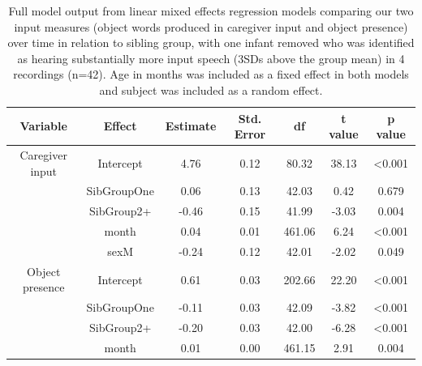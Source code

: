 \documentclass[
  man,floatsintext]{apa6}
\begin{document}
\begin{longtable}[t]{ccccccc}
\caption{\label{tab:table-input-model-summary-red}Full model output from linear mixed effects regression models comparing our two input measures (object words produced in caregiver input and object presence) over time in relation to sibling group, with one infant removed who was identified as hearing substantially more input speech (3SDs above the group mean) in 4 recordings (n=42). Age in months was included as a fixed effect in both models and subject was included as a random effect.}\\
\toprule
Variable & Effect & Estimate & Std. Error & df & t value & p value\\
\midrule
Caregiver input & Intercept & 4.76 & 0.12 & 80.32 & 38.13 & <0.001\\
 & SibGroupOne & 0.06 & 0.13 & 42.03 & 0.42 & 0.679\\
 & SibGroup2+ & -0.46 & 0.15 & 41.99 & -3.03 & 0.004\\
 & month & 0.04 & 0.01 & 461.06 & 6.24 & <0.001\\
 & sexM & -0.24 & 0.12 & 42.01 & -2.02 & 0.049\\
\midrule
\addlinespace
Object presence & Intercept & 0.61 & 0.03 & 202.66 & 22.20 & <0.001\\
 & SibGroupOne & -0.11 & 0.03 & 42.09 & -3.82 & <0.001\\
 & SibGroup2+ & -0.20 & 0.03 & 42.00 & -6.28 & <0.001\\
 & month & 0.01 & 0.00 & 461.15 & 2.91 & 0.004\\
\bottomrule
\end{longtable}
\end{document}
